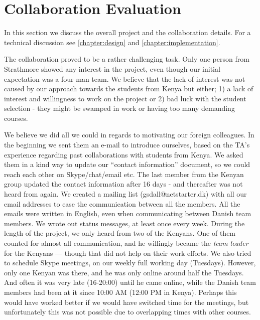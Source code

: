 \section{Collaboration Evaluation}\label{sec:discussioncollaboration}
In this section we discuss the overall project and the collaboration details. For a technical discussion see \ref{chapter:design} and \ref{chapter:implementation}. 

The collaboration proved to be a rather challenging task. Only one person from Strathmore showed any interest in the project, even though our initial expectation was a four man team. We believe that the lack of interest was not caused by our approach towards the students from Kenya but either; 1) a lack of interest and willingness to work on the project or 2) bad luck with the student selection - they might be swamped in work or having too many demanding courses.

We believe we did all we could in regards to motivating our foreign colleagues. In the beginning we sent them an e-mail to introduce ourselves, based on the TA's experience regarding past collaborations with students from Kenya. We asked them in a kind way to update our ``contact information'' document, so we could reach each other on Skype/chat/email etc. The last member from the Kenyan group updated the contact information after 16 days - and thereafter was not heard from again. We created a mailing list (gsdall@netstarter.dk) with all our email addresses to ease the communication between all the members. All the emails were written in English, even when communicating between Danish team members. We wrote out status messages, at least once every week. During the length of the project, we only heard from two of the Kenyans. One of them counted for almost all communication, and he willingly became the \textit{team leader} for the Kenyans --- though that did not help on their work efforts. We also tried to schedule Skype meetings, on our weekly full working day (Tuesdays). However, only one Kenyan was there, and he was only online around half the Tuesdays. And often it was very late (16-20:00) until he came online, while the Danish team members had been at it since 10:00 AM (12:00 PM in Kenya). Perhaps this would have worked better if we would have switched time for the meetings, but unfortunately this was not possible due to overlapping times with other courses.


